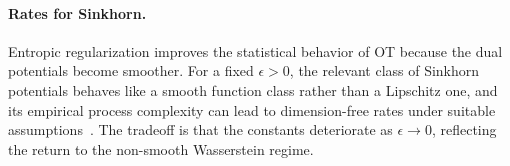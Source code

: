 \paragraph{Rates for Sinkhorn.}

Entropic regularization improves the statistical behavior of OT because the dual potentials become smoother. For a fixed $\epsilon>0$, the relevant class of Sinkhorn potentials behaves like a smooth function class rather than a Lipschitz one, and its empirical process complexity can lead to dimension-free rates under suitable assumptions~\cite{genevay2018sample}. The tradeoff is that the constants deteriorate as $\epsilon \rightarrow 0$, reflecting the return to the non-smooth Wasserstein regime.
